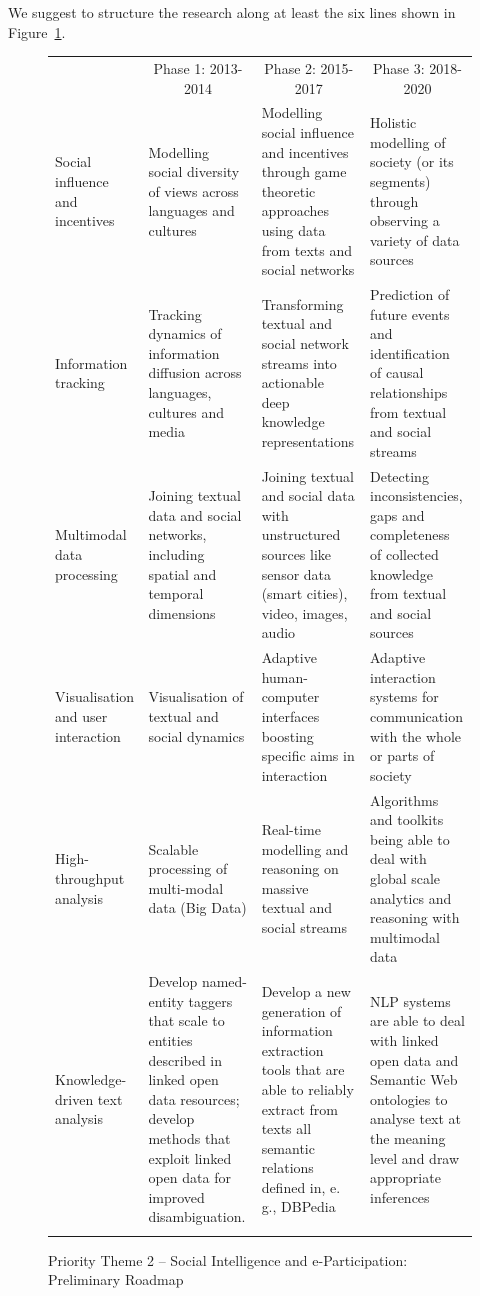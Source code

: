\documentclass[10pt, plain]{../../metanetpaper}
\begin{document}
\begin{multicols}{2}
We suggest to structure the research along at least the six lines shown in Figure~\ref{fig:pt2-roadmap}.

\begin{figure}[htb]
  \centering
  \small
  \begin{tabular}{@{}p{2.5cm}p{4cm}p{4cm}p{4cm}@{}} \toprule\addlinespace
    \multicolumn{1}{c}{Research Priority} & \multicolumn{1}{c}{Phase 1: 2013-2014} & \multicolumn{1}{c}{Phase 2: 2015-2017} & \multicolumn{1}{c}{Phase 3: 2018-2020} \\ \addlinespace\midrule\addlinespace
    Social influence and incentives & Modelling social diversity of views across languages and cultures & Modelling social influence and incentives  through game theoretic approaches using data from texts and social networks & Holistic modelling of society (or its segments) through observing a variety of data sources \\ \addlinespace
    Information tracking & Tracking dynamics of information diffusion across languages, cultures and media & Transforming textual and social network streams into actionable deep knowledge representations & Prediction of future events and identification of causal relationships from textual and social streams \\ \addlinespace
    Multimodal data processing & Joining textual data and social networks, including spatial and temporal dimensions & Joining textual and social data with unstructured sources like sensor data (smart cities), video, images, audio & Detecting inconsistencies, gaps and completeness of collected knowledge from textual and social sources \\ \addlinespace
    Visualisation and user interaction & Visualisation of textual and social dynamics & Adaptive human-computer interfaces boosting specific aims in interaction & Adaptive interaction systems for communication with the whole or parts of society \\ \addlinespace
    High-throughput analysis & Scalable processing of multi-modal data (Big Data) & Real-time modelling and reasoning on massive textual and social streams & Algorithms and toolkits being able to deal with global scale analytics and reasoning with multimodal data \\ \addlinespace
    Knowledge-driven text analysis & Develop named-entity taggers that scale to entities described in linked open data resources; develop methods that exploit linked open data for improved disambiguation. & Develop a new generation of information extraction tools that are able to reliably extract from texts all semantic relations defined in, e.\,g., DBPedia & NLP systems are able to deal with linked open data and Semantic Web ontologies to analyse text at the meaning level and draw appropriate inferences \\  \addlinespace\bottomrule
  \end{tabular}
  \caption{Priority Theme 2 -- Social Intelligence and e-Participation: Preliminary Roadmap}
  \label{fig:pt2-roadmap}
\end{figure}


\end{multicols}
\end{document}
